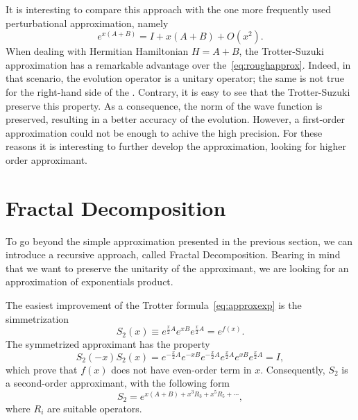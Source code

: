 It is interesting to compare this approach with the one more frequently used perturbational approximation, namely
\begin{equation} \label{eq:roughapprox}
e^{x(A+B)} = I + x(A+B) + O(x^2).
\end{equation}
When dealing with Hermitian Hamiltonian $H=A+B$, the Trotter-Suzuki approximation has a remarkable advantage over the~\eqref{eq:roughapprox}. Indeed, in that scenario, the evolution operator is a unitary operator; the same is not true for the right-hand side of the \label{eq:roughapprox}. Contrary, it is easy to see that the Trotter-Suzuki preserve this property. As a consequence, the norm of the wave function is preserved, resulting in a better accuracy of the evolution. However, a first-order approximation could not be enough  to achive the high precision. For these reasons it is interesting to further develop the approximation, looking for higher order approximant.

\section{Fractal Decomposition}

To go beyond the simple approximation presented in the previous section, we can introduce a recursive approach, called Fractal Decomposition. Bearing in mind that we want to preserve the unitarity of the approximant, we are looking for an approximation of exponentials product.

The easiest improvement of the Trotter formula~\eqref{eq:approxexp} is the simmetrization
\begin{equation} 
S_2(x) \equiv e^{\frac{x}{2}A} e^{xB} e^{\frac{x}{2}A} = e^{f(x)}.
\end{equation}
The symmetrized approximant has the property
\begin{equation}
S_2(-x) S_2(x) = e^{-\frac{x}{2}A} e^{-xB} e^{-\frac{x}{2}A} e^{\frac{x}{2}A} e^{xB} e^{\frac{x}{2}A} = I,
\end{equation}
which prove that $f(x)$ does not have even-order term in $x$. Consequently, $S_2$ is a second-order approximant, with the following form
\begin{equation} \label{eq:S2-form}
S_2 = e^{x(A+B) + x^3R_3 + x^5R_5 + \cdots},
\end{equation}
where $R_i$ are suitable operators.

